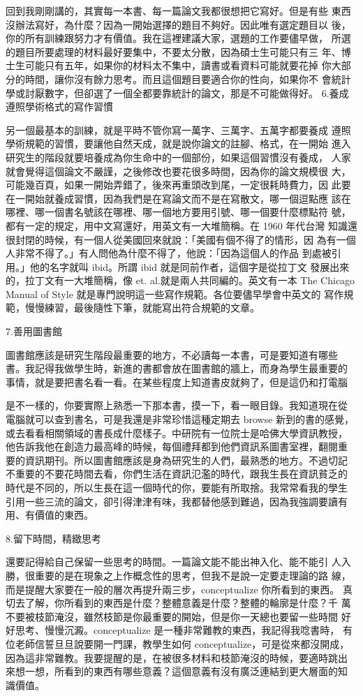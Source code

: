 回到我剛剛講的，其實每一本書、每一篇論文我都很想把它寫好。但是有些
東西沒辦法寫好，為什麼？因為一開始選擇的題目不夠好。因此唯有選定題目以
後，你的所有訓練跟努力才有價值。我在這裡建議大家，選題的工作要儘早做，
所選的題目所要處理的材料最好要集中，不要太分散，因為碩士生可能只有三
年、博士生可能只有五年，如果你的材料太不集中，讀書或看資料可能就要花掉
你大部分的時間，讓你沒有餘力思考。而且這個題目要適合你的性向，如果你不
會統計學或討厭數字，但卻選了一個全都要靠統計的論文，那是不可能做得好。 
6.養成遵照學術格式的寫作習慣

另一個最基本的訓練，就是平時不管你寫一萬字、三萬字、五萬字都要養成
遵照學術規範的習慣，要讓他自然天成，就是說你論文的註腳、格式，在一開始
進入研究生的階段就要培養成為你生命中的一個部份，如果這個習慣沒有養成，
人家就會覺得這個論文不嚴謹，之後修改也要花很多時間，因為你的論文規模很
大，可能幾百頁，如果一開始弄錯了，後來再重頭改到尾，一定很耗時費力，因
此要在一開始就養成習慣，因為我們是在寫論文而不是在寫散文，哪一個逗點應
該在哪裡、哪一個書名號該在哪裡、哪一個地方要用引號、哪一個要什麼標點符
號，都有一定的規定，用中文寫還好，用英文有一大堆簡稱。在 1960 年代台灣
知識還很封閉的時候，有一個人從美國回來就說：「美國有個不得了的情形，因
為有一個人非常不得了。」有人問他為什麼不得了，他說：「因為這個人的作品
到處被引用。」他的名字就叫 ibid。所謂 ibid 就是同前作者，這個字是從拉丁文
發展出來的，拉丁文有一大堆簡稱，像 et. al.就是兩人共同編的。英文有一本 The
Chicago Manual of Style 就是專門說明這一些寫作規範。各位要儘早學會中英文的
寫作規範，慢慢練習，最後隨性下筆，就能寫出符合規範的文章。

7.善用圖書館

 圖書館應該是研究生階段最重要的地方，不必讀每一本書，可是要知道有哪些
書。我記得我做學生時，新進的書都會放在圖書館的牆上，而身為學生最重要的
事情，就是要把書名看一看。在某些程度上知道書皮就夠了，但是這仍和打電腦

是不一樣的，你要實際上熟悉一下那本書，摸一下，看一眼目錄。我知道現在從
電腦就可以查到書名，可是我還是非常珍惜這種定期去 browse 新到的書的感覺，
或去看看相關領域的書長成什麼樣子。中研院有一位院士是哈佛大學資訊教授，
他告訴我他在創造力最高峰的時候，每個禮拜都到他們資訊系圖書室裡，翻閱重
要的資訊期刊。所以圖書館應該是身為研究生的人們，最熟悉的地方。不過切記
不重要的不要花時間去看，你們生活在資訊氾濫的時代，跟我生長在資訊貧乏的
時代是不同的，所以生長在這一個時代的你，要能有所取捨。我常常看我的學生
引用一些三流的論文，卻引得津津有味，我都替他感到難過，因為我強調要讀有
用、有價值的東西。

8.留下時間，精緻思考

還要記得給自己保留一些思考的時間。一篇論文能不能出神入化、能不能引
人入勝，很重要的是在現象之上作概念性的思考，但我不是說一定要走理論的路
線，而是提醒大家要在一般的層次再提升兩三步，conceptualize 你所看到的東西。
真切去了解，你所看到的東西是什麼？整體意義是什麼？整體的輪廓是什麼？千
萬不要被枝節淹沒，雖然枝節是你最重要的開始，但是你一天總也要留一些時間
好好思考、慢慢沉澱。conceptualize 是一種非常難教的東西，我記得我唸書時，
有位老師信誓旦旦說要開一門課，教學生如何 conceptualize，可是從來都沒開成，
因為這非常難教。我要提醒的是，在被很多材料和枝節淹沒的時候，要適時跳出
來想一想，所看到的東西有哪些意義？這個意義有沒有廣泛連結到更大層面的知
識價值。

